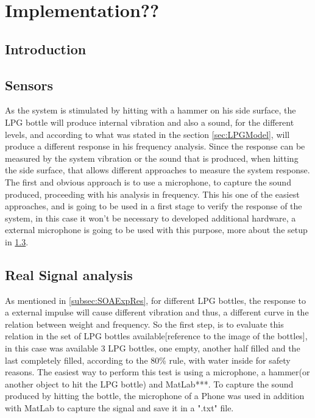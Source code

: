 \cleardoublepage
\chapter{Implementation??} \label{chap:trans}

\section{Introduction}
\section{Sensors} %
As the system is stimulated by hitting with a hammer on his side surface, the LPG bottle will produce internal vibration and also a sound, for the different levels, and according to what was stated in the section \ref{sec:LPGModel}, will produce a different response in his frequency analysis. Since the response can be measured by the system vibration or the sound that is produced, when hitting the side surface, that allows different approaches to measure the system response.\\
The first and obvious approach is to use a microphone, to capture the sound produced, proceeding with his analysis in frequency. This his one of the easiest approaches, and is going to be used in a first stage to verify the response of the system, in this case it won't be necessary to developed additional hardware, a external microphone is going to be used with this purpose, more about the setup in \ref{sec:MIC}.\\

\section{Real Signal analysis}\label{sec:MIC}
As mentioned in \ref{subsec:SOAExpRes}, for different LPG bottles, the response to a external impulse will cause different vibration and thus, a different curve in the relation between weight and frequency. So the first step, is to evaluate this relation in the set of LPG bottles available[reference to the image of the bottles], in this case was available 3 LPG bottles, one empty, another half filled and the last completely filled, according to the 80\% rule, with water inside for safety reasons. The easiest way to perform this test is using a microphone, a hammer(or another object to hit the LPG bottle) and MatLab***. To capture the sound produced by hitting the bottle, the microphone of a Phone was used in addition with MatLab to capture the signal and save it in a ".txt" file.
